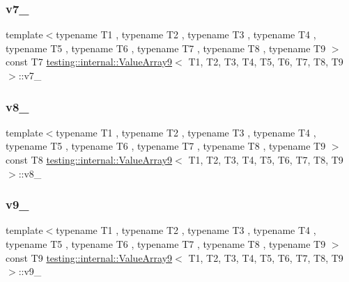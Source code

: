\subsubsection{\texorpdfstring{v7\_}{v7\_}}
{\footnotesize\ttfamily template$<$typename T1 , typename T2 , typename T3 , typename T4 , typename T5 , typename T6 , typename T7 , typename T8 , typename T9 $>$ \\
const T7 \mbox{\hyperlink{classtesting_1_1internal_1_1_value_array9}{testing\+::internal\+::\+Value\+Array9}}$<$ T1, T2, T3, T4, T5, T6, T7, T8, T9 $>$\+::v7\+\_\+\hspace{0.3cm}{\ttfamily [private]}}

\mbox{\label{classtesting_1_1internal_1_1_value_array9_af8e51b462201ee9e11700d7d068f850e}} 
\subsubsection{\texorpdfstring{v8\_}{v8\_}}
{\footnotesize\ttfamily template$<$typename T1 , typename T2 , typename T3 , typename T4 , typename T5 , typename T6 , typename T7 , typename T8 , typename T9 $>$ \\
const T8 \mbox{\hyperlink{classtesting_1_1internal_1_1_value_array9}{testing\+::internal\+::\+Value\+Array9}}$<$ T1, T2, T3, T4, T5, T6, T7, T8, T9 $>$\+::v8\+\_\+\hspace{0.3cm}{\ttfamily [private]}}

\mbox{\label{classtesting_1_1internal_1_1_value_array9_af3a2a4dd34e40daa035aeb7639399871}} 
\subsubsection{\texorpdfstring{v9\_}{v9\_}}
{\footnotesize\ttfamily template$<$typename T1 , typename T2 , typename T3 , typename T4 , typename T5 , typename T6 , typename T7 , typename T8 , typename T9 $>$ \\
const T9 \mbox{\hyperlink{classtesting_1_1internal_1_1_value_array9}{testing\+::internal\+::\+Value\+Array9}}$<$ T1, T2, T3, T4, T5, T6, T7, T8, T9 $>$\+::v9\+\_\+\hspace{0.3cm}{\ttfamily [private]}}



